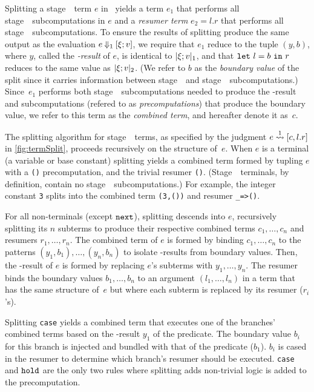Splitting a stage~\bbone\ term $e$ in \lang\ yields a term 
$e_1$ that performs all stage~\bbone\ subcomputations in $e$ and a \emph{resumer term} $e_2 = l.r$ that performs all stage~\bbtwo\ subcomputations.
To ensure the results of splitting produce the same output as the evaluation $e\mathbin{{\Downarrow_{ 1}}}[\xi;v]$,
we require that $e_1$ reduce to the tuple $(y,b)$,
where $y$, called the \emph{\bbone-result} of $e$, is identical to $|\xi;v|_{ 1}$, and that
${\tt let}~{l} = {b}~{\tt in}~{r}$ reduces to the same value as $|\xi;v|_{ 2}$. (We refer to $b$ as the \emph{boundary value} of the split since it carries information between stage~\bbone\ and stage~\bbtwo\ subcomputations.) Since~$e_1$ performs both stage~\bbone\ subcomputations needed to produce the \bbone-result and subcomputations (refered to as \emph{precomputations}) that produce the boundary value, we refer to this term as the \emph{combined term}, and hereafter denote it as~$c$.

The splitting algorithm for stage~\bbone\ terms, as specified by the
judgment $e \overset{ 1}\rightsquigarrow [c,l.r]$ in \cref{fig:termSplit}, proceeds
recursively on the structure of~$e$.
When $e$ is a terminal (a variable or base constant)
splitting yields a combined term formed by tupling $e$ with a \texttt{()} precomputation, and the trivial resumer \texttt{()}. (Stage~\bbone\ terminals, by definition, contain no stage~\bbtwo\ subcomputations.)  For example, the integer constant \texttt{3} splits into the combined term \texttt{(3,())} and resumer \texttt{\_=>()}.


For all non-terminals (except ${\tt next}$),
splitting descends into $e$, recursively splitting its $n$ subterms
to produce their respective combined terms $c_1,\ldots,c_n$ and resumers $r_1, \ldots, r_n$.
The combined term of $e$ is formed by binding $c_1,\ldots,c_n$
to the patterns $(y_1,b_1),\ldots,(y_n,b_n)$
to isolate \bbone-results from boundary values. Then,
the \bbone-result of $e$ is formed by replacing $e$'s subterms with $y_1,\ldots,y_n$.
The resumer binds the boundary values $b_1,\ldots,b_n$ to an
argument $(l_1,\ldots,l_n)$ in a term that has the same structure
of~$e$ but where each subterm is replaced by its resumer ($r_i$'s).

Splitting {\tt case} yields a combined term that executes one of the branches' combined terms based on the \bbone-result $y_1$ of the predicate.
The boundary value $b_i$ for this branch is injected and bundled with that of the predicate ($b_1$).   
$b_i$ is cased in the resumer to determine which branch's resumer should be executed.
{\tt case} and ${\tt hold}$ are the only two rules where splitting adds non-trivial logic is added to the precomputation.


